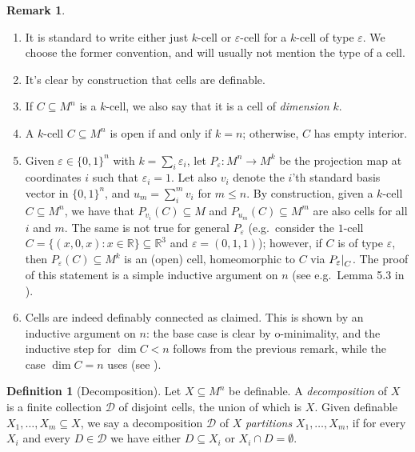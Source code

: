 \documentclass[a4paper]{report}
\newcommand{\R}{\mathbb{R}}
\newcommand{\D}{\mathcal{D}}
\newcommand\restr[2]{{\left.\kern-\nulldelimiterspace#1\right|_{#2}}}
\theoremstyle{definition}
\newtheorem{defn}[thm]{Definition}
\theoremstyle{remstyle}
\newtheorem{rem}[thm]{Remark}
\begin{document}
\begin{rem}\label{cellrem}\
	\begin{enumerate}
		\item It is standard to write either just $k$-cell or $\varepsilon$-cell for a $k$-cell of type $\varepsilon$. We choose the former convention, and will usually not mention the type of a cell.
		\item It's clear by construction that cells are definable.
		\item If $C\subseteq M^n$ is a $k$-cell, we also say that it is a cell of \emph{dimension} $k$.
		\item A $k$-cell $C\subseteq M^n$ is open if and only if $k=n$; otherwise, $C$ has empty interior.
		\item Given $\varepsilon\in\{0,1\}^n$ with $k=\sum_i\varepsilon_i$, let $P_\varepsilon :M^n\to M^k$ be the projection map at coordinates $i$ such that $\varepsilon_i=1$. Let also $v_i$ denote the $i$'th standard basis vector in $\{0,1\}^n$, and $u_m=\sum_i^m v_i$ for $m\leq n$. By construction, given a $k$-cell $C\subseteq M^n$, we have that $P_{v_i}(C)\subseteq M$ and $P_{u_m}(C)\subseteq M^m$ are also cells for all $i$ and $m$. The same is not true for general $P_\varepsilon$ (e.g.\ consider the $1$-cell $C=\{(x,0,x):x\in\R\}\subseteq\R^3$ and $\varepsilon=(0,1,1)$); however, if $C$ is of type $\varepsilon$, then $P_{\varepsilon}(C)\subseteq M^k$ is an (open) cell, homeomorphic to $C$ via $\restr{P_{\varepsilon}}{C}$. The proof of this statement is a simple inductive argument on $n$ (see e.g.\ Lemma 5.3 in \cite{neural1}).
		\item Cells are indeed definably connected as claimed. This is shown by an inductive argument on $n$: the base case is clear by o-minimality, and the inductive step for $\dim C<n$ follows from the previous remark, while the case $\dim C = n$ uses \Cref{defconbound} (see \cite{defII}).
	\end{enumerate}
\end{rem}

\begin{defn}[Decomposition]
	Let $X\subseteq M^n$ be definable. A \emph{decomposition} of $X$ is a finite collection $\D$ of disjoint cells, the union of which is $X$. Given definable $X_1,\ldots,X_m\subseteq X$, we say a decomposition $\D$ of $X$ \emph{partitions} $X_1,\ldots,X_m$, if for every $X_i$ and every $D\in\D$ we have either $D\subseteq X_i$ or $X_i\cap D=\emptyset$.
\end{defn}
\end{document}

